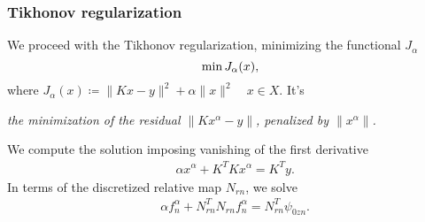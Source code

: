 \documentclass[10pt,xcolor={dvipsnames}]{beamer}
\theoremstyle{plain}
\theoremstyle{plain}
\begin{document}
\begin{frame}
 \frametitle{Tikhonov regularization}
We proceed with the {\color{blue}Tikhonov regularization}, minimizing the functional $J_\alpha$
 \begin{equation}
  \textup{min}\,J_\alpha(x),
 \end{equation}
where $J_\alpha(x)\coloneqq\|Kx - y\|^2 + \alpha\|x\|^2\quad x\in X$. It's
\begin{center}
\emph{
the minimization of the residual $\|Kx^{\alpha} - y\|$,
penalized by 
$\|x^\alpha\|$.
}
\end{center}
We compute the solution imposing vanishing of the first derivative
\begin{align}
 &\alpha x^{\alpha} + K^TKx^{\alpha} = K^Ty.
\end{align}
In terms of the discretized relative map $N_{rn}$, we solve
\begin{align}
 &\alpha f_n^{\alpha} + N_{rn}^TN_{rn}f_n^{\alpha} = N_{rn}^T\psi_{0zn}\label{eq:tikh-reg-lsm-discrete}.
\end{align}

\end{frame}
\end{document}
